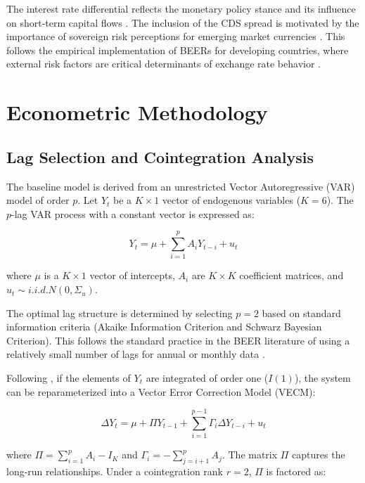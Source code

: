 \documentclass[11pt,a4paper]{article}
\begin{document}
The interest rate differential reflects the monetary policy stance and its influence on short-term capital flows \citep{ClarkMacDonald1998}. The inclusion of the CDS spread is motivated by the importance of sovereign risk perceptions for emerging market currencies \citep{Edwards1989, Elbadawi1994}. This follows the empirical implementation of BEERs for developing countries, where external risk factors are critical determinants of exchange rate behavior \citep{Edwards1989, Elbadawi1994}.

\section{Econometric Methodology}

\subsection{Lag Selection and Cointegration Analysis}

The baseline model is derived from an unrestricted Vector Autoregressive (VAR) model of order $p$. Let $Y_t$ be a $K \times 1$ vector of endogenous variables ($K=6$). The $p$-lag VAR process with a constant vector is expressed as:

\begin{equation}
Y_t = \mu + \sum_{i=1}^{p} A_i Y_{t-i} + u_t
\label{eq:var_general}
\end{equation}

where $\mu$ is a $K \times 1$ vector of intercepts, $A_i$ are $K \times K$ coefficient matrices, and $u_t \sim i.i.d. N(0, \Sigma_u)$.

The optimal lag structure is determined by selecting $p=2$ based on standard information criteria (Akaike Information Criterion and Schwarz Bayesian Criterion). This follows the standard practice in the BEER literature of using a relatively small number of lags for annual or monthly data \citep{ClarkMacDonald1998, MacDonald1995}.

Following \cite{Johansen1991, Johansen1995}, if the elements of $Y_t$ are integrated of order one ($I(1)$), the system can be reparameterized into a Vector Error Correction Model (VECM):

\begin{equation}
\Delta Y_t = \mu + \Pi Y_{t-1} + \sum_{i=1}^{p-1} \Gamma_i \Delta Y_{t-i} + u_t
\label{eq:vecm_general}
\end{equation}

where $\Pi = \sum_{i=1}^{p} A_i - I_K$ and $\Gamma_i = -\sum_{j=i+1}^{p} A_j$. The matrix $\Pi$ captures the long-run relationships. Under a cointegration rank $r = 2$, $\Pi$ is factored as:
\end{document}
